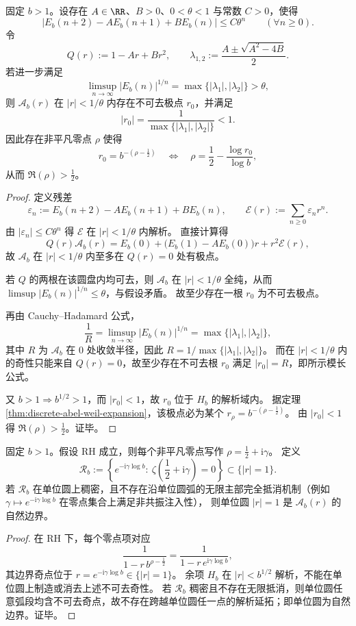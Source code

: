 \begin{theorem}[指数精度二阶递归强制右端零点出现]\label{thm:xi-abel-ar2-exp-error-forces-rightedge-zero}
固定 \(b>1\)。设存在 \(A\in\RR\)、\(B>0\)、\(0<\theta<1\) 与常数 \(C>0\)，使得
\[
\bigl|E_b(n+2)-AE_b(n+1)+BE_b(n)\bigr|\le C\theta^n
\qquad(\forall n\ge 0).
\]
令
\[
Q(r):=1-Ar+Br^2,\qquad
\lambda_{1,2}:=\frac{A\pm\sqrt{A^2-4B}}{2}.
\]
若进一步满足
\[
\limsup_{n\to\infty}|E_b(n)|^{1/n}
=\max\{|\lambda_1|,|\lambda_2|\}
>\theta,
\]
则 \(\mathcal A_b(r)\) 在 \(|r|<1/\theta\) 内存在不可去极点 \(r_0\)，并满足
\[
|r_0|=\frac{1}{\max\{|\lambda_1|,|\lambda_2|\}}<1.
\]
因此存在非平凡零点 \(\rho\) 使得
\[
r_0=b^{-(\rho-\frac12)}
\quad\Longleftrightarrow\quad
\rho=\frac12-\frac{\log r_0}{\log b},
\]
从而 \(\Re(\rho)>\frac12\)。
\end{theorem}
\begin{proof}
定义残差
\[
\varepsilon_n:=E_b(n+2)-AE_b(n+1)+BE_b(n),\qquad
\mathcal E(r):=\sum_{n\ge 0}\varepsilon_n r^n.
\]
由 \(|\varepsilon_n|\le C\theta^n\) 得 \(\mathcal E\) 在 \(|r|<1/\theta\) 内解析。
直接计算得
\[
Q(r)\mathcal A_b(r)
=E_b(0)+\bigl(E_b(1)-AE_b(0)\bigr)r+r^2\mathcal E(r),
\]
故 \(\mathcal A_b\) 在 \(|r|<1/\theta\) 内至多在 \(Q(r)=0\) 处有极点。

若 \(Q\) 的两根在该圆盘内均可去，则 \(\mathcal A_b\) 在 \(|r|<1/\theta\) 全纯，从而
\(
\limsup |E_b(n)|^{1/n}\le \theta
\)，与假设矛盾。
故至少存在一根 \(r_0\) 为不可去极点。

再由 Cauchy--Hadamard 公式，
\[
\frac{1}{R}=\limsup_{n\to\infty}|E_b(n)|^{1/n}
=\max\{|\lambda_1|,|\lambda_2|\},
\]
其中 \(R\) 为 \(\mathcal A_b\) 在 \(0\) 处收敛半径，因此
\(
R=1/\max\{|\lambda_1|,|\lambda_2|\}
\)。
而在 \(|r|<1/\theta\) 内的奇性只能来自 \(Q(r)=0\)，故至少存在不可去根 \(r_0\) 满足 \(|r_0|=R\)，即所示模长公式。

又 \(b>1\Rightarrow b^{1/2}>1\)，而 \(|r_0|<1\)，故 \(r_0\) 位于 \(H_b\) 的解析域内。
据定理 \ref{thm:discrete-abel-weil-expansion}，该极点必为某个
\(
r_\rho=b^{-(\rho-\frac12)}
\)。
由 \(|r_0|<1\) 得 \(\Re(\rho)>\frac12\)。证毕。
\end{proof}

\begin{theorem}[临界线极点稠密性导出单位圆自然边界]\label{thm:xi-abel-rh-dense-poles-natural-boundary}
固定 \(b>1\)。假设 RH 成立，则每个非平凡零点写作
\(
\rho=\frac12+\mathrm{i}\gamma
\)。
定义
\[
\mathcal R_b:=\left\{e^{-\mathrm{i}\gamma\log b}:\ \zeta\!\left(\frac12+\mathrm{i}\gamma\right)=0\right\}\subset\{|r|=1\}.
\]
若 \(\mathcal R_b\) 在单位圆上稠密，且不存在沿单位圆弧的无限主部完全抵消机制（例如
\(\gamma\mapsto e^{-\mathrm{i}\gamma\log b}\) 在零点集合上满足非共振注入性），
则单位圆 \(|r|=1\) 是 \(\mathcal A_b(r)\) 的自然边界。
\end{theorem}
\begin{proof}
在 RH 下，每个零点项对应
\[
\frac{1}{1-r\,b^{\rho-\frac12}}
=\frac{1}{1-r\,e^{\mathrm{i}\gamma\log b}},
\]
其边界奇点位于 \(r=e^{-\mathrm{i}\gamma\log b}\in\{|r|=1\}\)。
余项 \(H_b\) 在 \(|r|<b^{1/2}\) 解析，不能在单位圆上制造或消去上述不可去奇性。
若 \(\mathcal R_b\) 稠密且不存在无限抵消，则单位圆任意弧段均含不可去奇点，故不存在跨越单位圆任一点的解析延拓；即单位圆为自然边界。证毕。
\end{proof}

